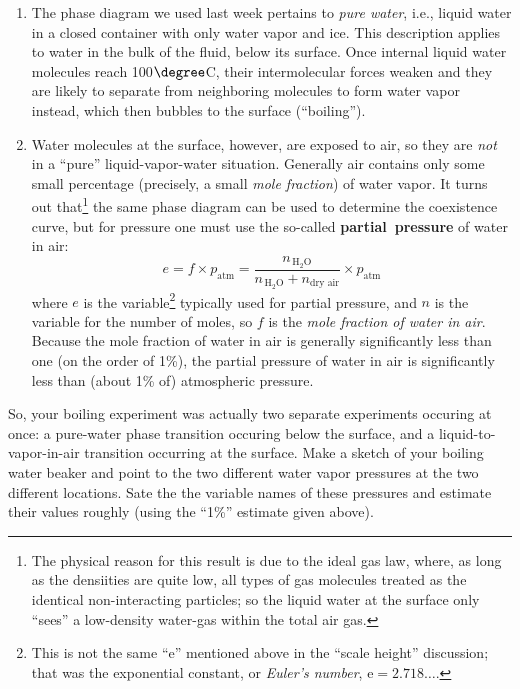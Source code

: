 	\begin{enumerate}[label=(\roman*)]
	\item The phase diagram we used last week pertains to {\em pure water}, i.e., liquid water in a closed container with only water vapor and ice.  This description applies to water in the bulk of the fluid, below its surface.  Once internal liquid water molecules reach 100$\degree$C, their intermolecular forces weaken and they are likely to separate from neighboring molecules to form water vapor instead, which then bubbles to the surface (``boiling'').
	\item Water molecules at the surface, however,  are exposed to air, so they are {\em not} in a ``pure'' liquid-vapor-water situation.  Generally air contains only some small percentage (precisely, a small {\em mole fraction}) of water vapor.  It turns out that\footnote{The physical reason for this result is due to the ideal gas law, where, as long as the densiities are quite low, all types of gas molecules treated as the identical non-interacting particles; so the liquid water at the surface only ``sees'' a low-density water-gas within the total air gas.} the same phase diagram can be used to determine the coexistence curve, but for pressure one must use the so-called {\bf partial~pressure} of water in air: 
		\begin{equation*}
		e = f \times p_\text{atm} = \frac{n_{\, \text{H}_2\text{O}}}{n_{\, \text{H}_2\text{O}} + n_\text{dry air}} \times p_\text{atm}
		\end{equation*}
	where $e$ is the variable\footnote{This is not the same ``e'' mentioned above in the ``scale height'' discussion; that was the exponential constant, or {\em Euler's number}, $\text{e} = 2.718\ldots$.} typically used for partial pressure, and $n$ is the variable for the number of moles, so $f$ is the {\em mole fraction of water in air}. Because the mole fraction of water in air is generally significantly less than one (on the order of 1\%), the partial pressure of water in air is significantly less than (about 1\% of) atmospheric pressure. 
	\end{enumerate}
So, your boiling experiment was actually two separate experiments occuring at once: a pure-water phase transition occuring below the surface, and a liquid-to-vapor-in-air transition occurring at the surface.  Make a sketch of your boiling water beaker and point to the two different  water vapor pressures at the two different locations.  Sate the the variable names of these pressures and estimate their values roughly (using the ``1\%'' estimate given above).

